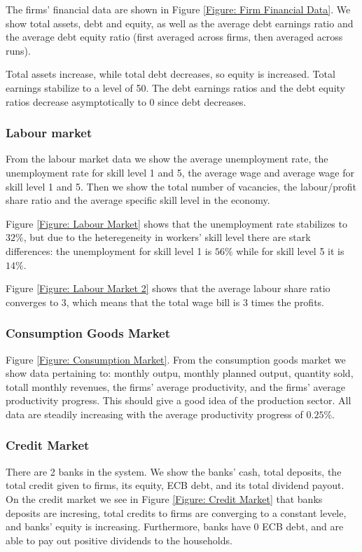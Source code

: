 The firms' financial data are shown in Figure \ref{Figure: Firm Financial Data}. We show total assets, debt and equity, as well as
the average debt earnings ratio and the average debt equity ratio (first averaged across firms, then averaged across runs).

Total assets increase, while total debt decreases, so equity is increased. Total earnings stabilize to a level of 50.
The debt earnings ratios and the debt equity ratios decrease asymptotically to 0 since debt decreases.

\subsubsection*{Labour market}
From the labour market data we show the average unemployment rate, the unemployment rate for skill level 1 and 5, the average wage and 
average wage for skill level 1 and 5. Then we show the total number of vacancies, the labour/profit share ratio and the average specific skill level in the economy.

Figure \ref{Figure: Labour Market} shows that the unemployment rate stabilizes to $32\%$, but due to the heteregeneity in workers' skill level there are stark differences: the unemployment for skill level 1 is $56\%$ while for skill level  5 it is $14\%$.

Figure \ref{Figure: Labour Market 2} shows that the average labour share ratio converges to 3, which means that the total wage bill is 3 times the profits.

\subsubsection*{Consumption Goods Market}
Figure \ref{Figure: Consumption Market}.
From the consumption goods market we show data pertaining to: monthly outpu, monthly planned output, quantity sold, totall monthly revenues,
the firms' average productivity, and the firms' average productivity progress. This should give a good idea of the production sector.
All data are steadily increasing with the average productivity progress of $0.25\%$.

\subsubsection*{Credit Market}
There are 2 banks in the system. 
We show the banks' cash, total deposits, the total credit given to firms, its equity, ECB debt, and its total dividend payout.
On the credit market we see in Figure \ref{Figure: Credit Market} that banks deposits are incresing, total credits to firms are converging to a constant levele, and banks' equity is increasing. Furthermore, banks have 0 ECB debt, and are able to pay out positive dividends to the households.


